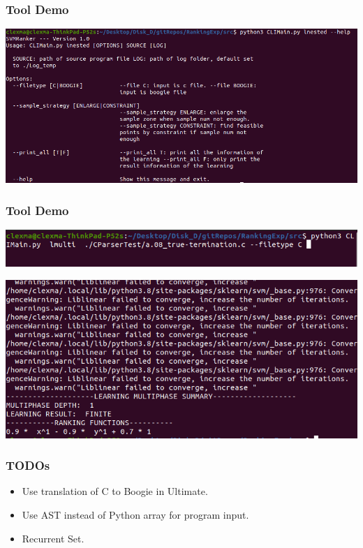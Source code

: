 \documentclass[10pt]{beamer}
\begin{document}
\begin{frame}\frametitle{Tool Demo}
\begin{center}
\includegraphics[scale=0.34]{3.png}
\end{center}

\end{frame}
\begin{frame}\frametitle{Tool Demo}
\begin{center}
\includegraphics[scale=0.4]{5.png}

\includegraphics[scale=0.4]{4.png}
\end{center}
\end{frame}

\begin{frame}\frametitle{TODOs}
\begin{itemize}
\item Use translation of C to Boogie in Ultimate.

\item Use AST instead of Python array for program input.

\item Recurrent Set.
\end{itemize}
\end{frame}
\end{document}
